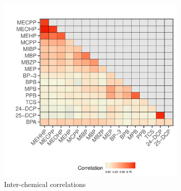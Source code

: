 \begin{landscape}
\begin{figure}
\centering
\begin{subfigure}[b]{0.7\textwidth}
\includegraphics[scale = 0.69]{./figures/ppp_corr.pdf}
\caption{Inter-chemical correlations}
\label{fig:corr}
\end{subfigure}
\hspace{5em}
\begin{subfigure}[b]{0.3\textwidth}

\end{subfigure}
\end{figure}
\end{landscape}
